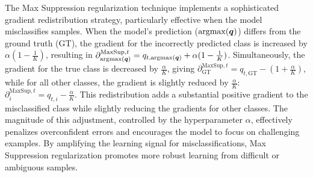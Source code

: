 The Max Suppression regularization technique implements a sophisticated gradient redistribution strategy, particularly effective when the model misclassifies samples. When the model's prediction ($\operatorname{argmax}({\bm{q}})$) differs from the ground truth (GT), the gradient for the incorrectly predicted class is increased by $\alpha(1 - \frac{1}{K})$, resulting in $\partial_{\operatorname{argmax}({\bm{q}})}^{\text{MaxSup}, t} = q_{t,\operatorname{argmax}({\bm{q}})} + \alpha(1 - \frac{1}{K})$. Simultaneously, the gradient for the true class is decreased by $\frac{\alpha}{K}$, giving $\partial_{\text{GT}}^{\text{MaxSup}, t} = q_{t,\text{GT}} - (1 + \frac{\alpha}{K})$, while for all other classes, the gradient is slightly reduced by $\frac{\alpha}{K}$: $\partial_i^{\text{MaxSup}, t} = q_{t,i} - \frac{\alpha}{K}$. This redistribution adds a substantial positive gradient to the misclassified class while slightly reducing the gradients for other classes. The magnitude of this adjustment, controlled by the hyperparameter $\alpha$, effectively penalizes overconfident errors and encourages the model to focus on challenging examples. By amplifying the learning signal for misclassifications, Max Suppression regularization promotes more robust learning from difficult or ambiguous samples.



